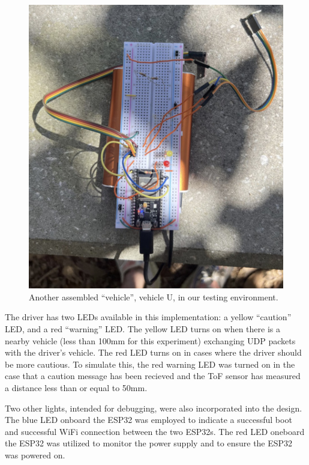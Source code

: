\documentclass[conference]{IEEEtran}
\begin{document}
\begin{figure}[htbp]
\centerline{\includegraphics[width=\linewidth]{pics/up_vehicle_outside.jpg}}
\caption{Another assembled ``vehicle'', vehicle U, in our testing environment.}
\label{up_outside}
\end{figure}

The driver has two LEDs available in this implementation: a yellow ``caution''
LED, and a red ``warning'' LED. The yellow LED turns on when there is a nearby vehicle
(less than 100mm for this experiment) exchanging UDP packets with the driver's vehicle.
The red LED turns on in cases where the driver should be more cautious. To simulate this,
the red warning LED was turned on in the case that a caution message has been recieved and 
the ToF sensor has measured a distance less than or equal to 50mm.

Two other lights, intended for debugging, were also incorporated into the design. The blue
LED onboard the ESP32 was employed to indicate a successful boot and successful WiFi
connection between the two ESP32s. The red LED oneboard the ESP32 was utilized to 
monitor the power supply and to ensure the ESP32 was powered on.
\end{document}
